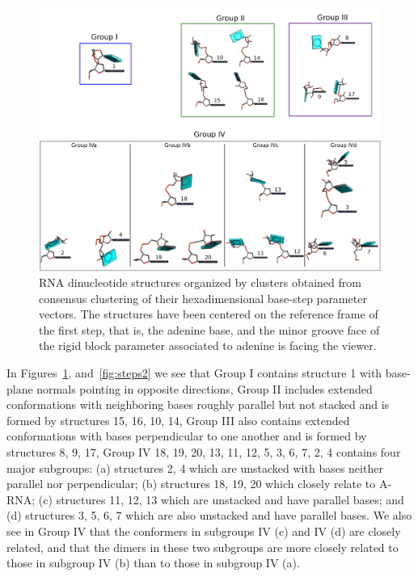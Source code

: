 \begin{figure}[htbp]
 \centering
\includegraphics[angle=90, scale=0.46]{Chapter2/collageb.png}
 \caption{RNA dinucleotide structures  organized by clusters obtained
   from  consensus  clustering   of  their  hexadimensional  base-step
   parameter  vectors.  The  structures  have  been  centered  on  the
   reference frame of  the first step, that is,  the adenine base, and
   the minor  groove face of  the rigid block parameter  associated to
   adenine is facing the viewer.}
 \label{fig:nonAclus}
\end{figure}

In Figures~\ref{fig:nonAclus}, and~\ref{fig:steps2}  we see that Group
I contains structure {1}  with base-plane normals pointing in opposite
directions, Group II  includes extended conformations with neighboring
bases roughly  parallel but  not stacked and  is formed  by structures
{15, 16, 10, 14}, Group  III also contains extended conformations with
bases perpendicular to one another  and is formed by structures {8, 9,
  17}, Group IV  {18, 19, 20, 13, 11,  12, 5, 3, 6, 7,  2, 4} contains
four major subgroups:  (a) structures {2, 4} which  are unstacked with
bases neither parallel nor  perpendicular; (b) structures {18, 19, 20}
which closely relate  to A-RNA; (c) structures {11,  12, 13} which are
unstacked and  have parallel  bases; and (d)  structures {3, 5,  6, 7}
which are also unstacked and have parallel bases. We also see in Group
IV that  the conformers  in subgroups  IV (c) and  IV (d)  are closely
related, and that  the dimers in these two  subgroups are more closely
related to those in subgroup IV (b) than to those in subgroup IV (a).

